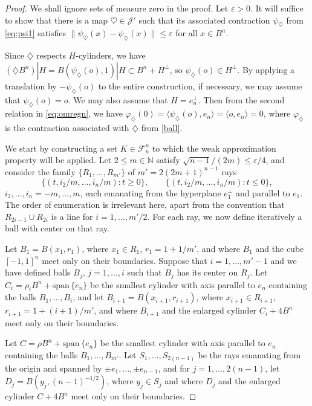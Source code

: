 \documentclass[10pt,a4paper]{amsart}
\newcommand{\N}{{\mathbb N}}
\newcommand{\cF}{\mathcal F}
\newcommand{\cJ}{\mathcal J}
\newcommand{\di}{\diamondsuit}
\newcommand{\ee}{\varepsilon}
\newcommand{\myspan}{{\mathrm{span}}\,}
\begin{document}
\begin{proof}
We shall ignore sets of measure zero in the proof. Let $\ee>0$. It will suffice to show that there is a map $\heartsuit\in\cJ'$ such that its associated contraction $\psi_{\heartsuit}$ from \eqref{eq:psi1} satisfies $\|\psi_{\heartsuit}(x)-\psi_\di(x)\|\le \ee$ for all $x\in B^n$.

Since $\di$ respects $H$-cylinders, we have $(\di B^n)|H=
B(\psi_\di(o),1)|H\subset B^n+H^{\perp}$, so $\psi_\di(o)\in H^\perp$. By applying a translation by $-\psi_\di(o)$ to the entire construction, if necessary, we may assume that $\psi_\di(o)=o$. We may also assume that $H=e_n^\perp$.  Then from the second relation in \eqref{eq:omregn}, we have $\varphi_{\di}(0)=\langle \psi_{\di}(o),e_n\rangle=\langle o,e_n\rangle=0$, where $\varphi_{\di}$ is the contraction associated with $\di$ from \eqref{ball}.

We start by constructing a set $K\in \cF_n^n$ to which the weak approximation property will be applied. Let $2\le m\in \N$ satisfy $\sqrt{n-1}/(2m)\le \ee/4$, and consider the family $\{R_1,\ldots,R_{m'}\}$ of $m'=2(2m+1)^{n-1}$ rays
\[
\{(t,i_2/m,\ldots,i_n/m):t\ge 0\},\qquad
\{(t,i_2/m,\ldots,i_n/m):t\le 0\},
\]
$i_2,\ldots,i_n=-m,\dots,m$, each emanating from the hyperplane $e_1^{\perp}$ and parallel to $e_1$.  The order of enumeration is irrelevant here, apart from the convention that $R_{2i-1}\cup R_{2i}$ is a line for $i=1,\dots,m'/2$. For each ray, we now define iteratively a ball with center on that ray.

Let $B_{1}=B(x_1,r_1)$, where $x_1\in R_1$, $r_1=1+1/m'$, and where $B_{1}$ and the cube $[-1,1]^n$ meet only on their boundaries.  Suppose that $i=1,\dots,m'-1$ and we have defined balls $B_j$, $j=1,\dots,i$ such that $B_j$ has its center on $R_j$.  Let $C_i=\rho_i B^n+\myspan\{e_n\}$ be the smallest cylinder with axis parallel to $e_n$ containing the balls $B_1,\dots,B_i$, and let $B_{i+1}=B(x_{i+1},r_{i+1})$, where $x_{i+1}\in R_{i+1}$, $r_{i+1}=1+(i+1)/m'$, and where $B_{i+1}$ and the enlarged cylinder $C_i+4B^n$ meet only on their boundaries.

Let $C=\rho B^n+\myspan\{e_n\}$ be the smallest cylinder with axis parallel to $e_n$ containing the balls $B_1,\dots,B_{m'}$. Let $S_1,\dots,S_{2(n-1)}$ be the rays emanating from the origin and spanned by $\pm e_1,\dots,\pm e_{n-1}$, and for $j=1,\dots,2(n-1)$, let $D_j=B(y_j,(n-1)^{-1/2})$, where $y_j\in S_j$ and where $D_j$ and the enlarged cylinder $C+4B^n$ meet only on their boundaries.


\end{proof}
\end{document}
